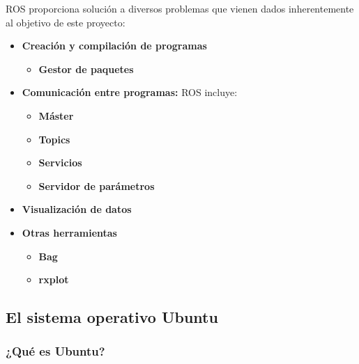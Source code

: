 \documentclass[10pt, a4paper]{report}
\begin{document}
ROS proporciona solución a diversos problemas que vienen dados inherentemente al objetivo de este proyecto:

\begin{itemize}

\item \textbf{Creación y compilación de programas}

\begin{itemize}

\item \textbf{Gestor de paquetes}

\end{itemize}

\item \textbf{Comunicación entre programas:}
ROS incluye:

\begin{itemize}

\item \textbf{Máster}

\item \textbf{Topics}

\item \textbf{Servicios}

\item \textbf{Servidor de parámetros}

\end{itemize}

\item \textbf{Visualización de datos}

\item \textbf{Otras herramientas}

\begin{itemize}

\item \textbf{Bag}

\item \textbf{rxplot}

\end{itemize}


\end{itemize}

\subsection{El sistema operativo Ubuntu}

\subsubsection{¿Qué es Ubuntu?}
\end{document}
